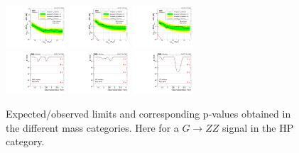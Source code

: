 \begin{figure}[h!]
\centering
\includegraphics[width=0.20\textwidth]{figures/analysis/search1/AN-15-211/limits/brazilianFlag_BulkZZ_WWHP_13TeV_wPDF.pdf}
\includegraphics[width=0.20\textwidth]{figures/analysis/search1/AN-15-211/limits/brazilianFlag_BulkZZ_WZHP_13TeV_wPDF.pdf}
\includegraphics[width=0.20\textwidth]{figures/analysis/search1/AN-15-211/limits/brazilianFlag_BulkZZ_ZZHP_13TeV_wPDF.pdf}\\
\includegraphics[width=0.20\textwidth]{figures/analysis/search1/AN-15-211/pvalues/pvalue_BulkZZinWW_high_purity.pdf}
\includegraphics[width=0.20\textwidth]{figures/analysis/search1/AN-15-211/pvalues/pvalue_BulkZZinWZ_high_purity.pdf}
\includegraphics[width=0.20\textwidth]{figures/analysis/search1/AN-15-211/pvalues/pvalue_BulkZZinZZ_high_purity.pdf}
\caption{Expected/observed limits and corresponding p-values obtained in the different mass categories. Here for a $G\rightarrow ZZ$ signal in the HP category.}
\label{fig:app:Limits_HPBulkZZ}
\end{figure}

